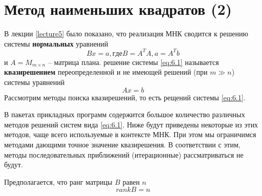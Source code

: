 \section{Метод наименьших квадратов (2)}


В лекции \ref{lecture5} было показано, что реализация МНК сводится к решению системы \textbf{нормальных} уравнений 
\begin{equation} \label{eq:6.1}
	Bx = a, где B = A^TA, a = A^Tb
\end{equation}
и $A=M_{m \times n}$  -- матрица плана. решение системы \ref{eq:6.1} называется \textbf{квазирешением} переопределенной и не имеющей решений (при $m\gg n$) системы уравнений 
\begin{equation}
	Ax = b
\end{equation}
Рассмотрим методы поиска квазирешений, то есть рещений системы \ref{eq:6.1}. 


В пакетах прикладных программ содержится большое количество различных методов решений систем вида \ref{eq:6.1}. Ниже будут приведены некоторые из этих методов, чаще всего используемые в контексте МНК. При этом мы ограничимся методами дающими точное значение квазирешения. В соответствии с этим, методы последовательных приближений (итерационные) рассматриваться не будут.

Предполагается, что ранг матрицы $B$ равен $n$
\begin{equation}
	rank B = n
\end{equation}